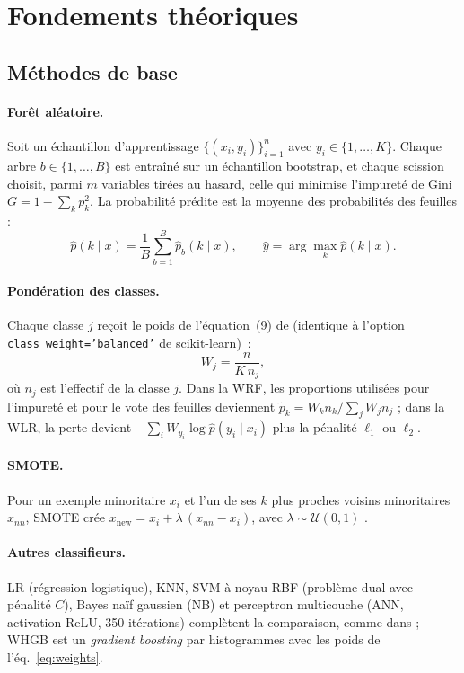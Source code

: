 \section{Fondements théoriques}

\subsection{Méthodes de base}
\paragraph{Forêt aléatoire.} Soit un échantillon d'apprentissage $\{(x_i,y_i)\}_{i=1}^{n}$ avec $y_i\in\{1,\dots,K\}$. Chaque arbre $b\in\{1,\dots,B\}$ est entraîné sur un échantillon bootstrap, et chaque scission choisit, parmi $m$ variables tirées au hasard, celle qui minimise l'impureté de Gini $G=1-\sum_{k}p_k^{2}$. La probabilité prédite est la moyenne des probabilités des feuilles :
\begin{equation}
\hat p(k\mid x)=\frac1B\sum_{b=1}^{B}\hat p_b(k\mid x),\qquad \hat y=\arg\max_k \hat p(k\mid x).
\end{equation}

\paragraph{Pondération des classes.} Chaque classe $j$ reçoit le poids de l'équation~(9) de \cite{bader2024} (identique à l'option \texttt{class\_weight='balanced'} de scikit-learn)~:
\begin{equation}
W_j=\frac{n}{K\,n_j},
\label{eq:weights}
\end{equation}
où $n_j$ est l'effectif de la classe $j$. Dans la WRF, les proportions utilisées pour l'impureté et pour le vote des feuilles deviennent $\tilde p_k=W_k n_k/\sum_j W_j n_j$ ; dans la WLR, la perte devient $-\sum_i W_{y_i}\log\hat p(y_i\mid x_i)$ plus la pénalité $\ell_1$ ou $\ell_2$.

\paragraph{SMOTE.} Pour un exemple minoritaire $x_i$ et l'un de ses $k$ plus proches voisins minoritaires $x_{nn}$, SMOTE crée $x_{\text{new}}=x_i+\lambda\,(x_{nn}-x_i)$, avec $\lambda\sim\mathcal U(0,1)$ \cite{chawla2002}.

\paragraph{Autres classifieurs.} LR (régression logistique), KNN, SVM à noyau RBF (problème dual avec pénalité $C$), Bayes naïf gaussien (NB) et perceptron multicouche (ANN, activation ReLU, 350 itérations) complètent la comparaison, comme dans \cite{bader2024} ; WHGB est un \emph{gradient boosting} par histogrammes avec les poids de l'éq.~\eqref{eq:weights}.

